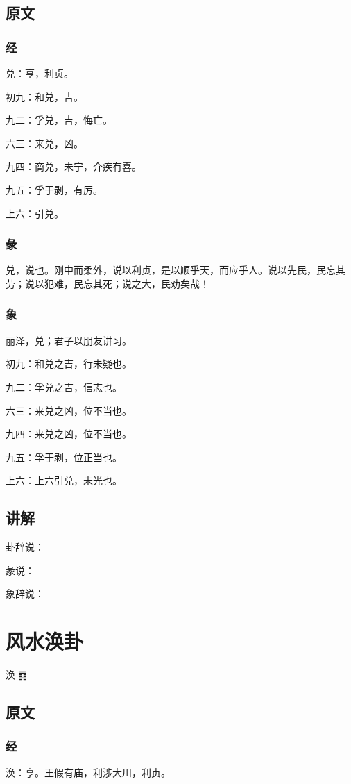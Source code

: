\documentclass[12pt,oneside]{book}
\begin{document}
\section{原文}

\subsection{经}
兑：亨，利贞。

初九：和兑，吉。

九二：孚兑，吉，悔亡。

六三：来兑，凶。

九四：商兑，未宁，介疾有喜。

九五：孚于剥，有厉。

上六：引兑。

\subsection{彖}
兑，说也。刚中而柔外，说以利贞，是以顺乎天，而应乎人。说以先民，民忘其劳；说以犯难，民忘其死；说之大，民劝矣哉！

\subsection{象}
丽泽，兑；君子以朋友讲习。

初九：和兑之吉，行未疑也。

九二：孚兑之吉，信志也。

六三：来兑之凶，位不当也。

九四：来兑之凶，位不当也。

九五：孚于剥，位正当也。

上六：上六引兑，未光也。

\section{讲解}
卦辞说：

彖说：

象辞说：

\chapter{风水涣卦}
涣 {\Large ䷺}

\section{原文}

\subsection{经}
涣：亨。王假有庙，利涉大川，利贞。
\end{document}
